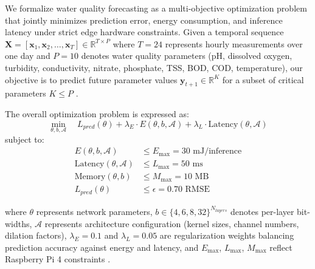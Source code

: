 \documentclass[12pt,a4paper]{article}
\begin{document}
We formalize water quality forecasting as a multi-objective optimization problem that jointly minimizes prediction error, energy consumption, and inference latency under strict edge hardware constraints. Given a temporal sequence $\mathbf{X} = [\mathbf{x}_1, \mathbf{x}_2, \ldots, \mathbf{x}_T] \in \mathbb{R}^{T \times P}$ where $T=24$ represents hourly measurements over one day and $P=10$ denotes water quality parameters (pH, dissolved oxygen, turbidity, conductivity, nitrate, phosphate, TSS, BOD, COD, temperature), our objective is to predict future parameter values $\mathbf{y}_{t+1} \in \mathbb{R}^{K}$ for a subset of critical parameters $K \leq P$ \citep{lin2021tcan, essamlali2024iotml}.

The overall optimization problem is expressed as:
\begin{equation}
\label{eq:objective}
\min_{\theta, b, \mathcal{A}} \quad L_{pred}(\theta) + \lambda_E \cdot E(\theta, b, \mathcal{A}) + \lambda_L \cdot \text{Latency}(\theta, \mathcal{A})
\end{equation}
subject to:
\begin{align}
E(\theta, b, \mathcal{A}) &\leq E_{\max} = 30 \text{ mJ/inference} \label{eq:energy_constraint}\\
\text{Latency}(\theta, \mathcal{A}) &\leq L_{\max} = 50 \text{ ms} \label{eq:latency_constraint}\\
\text{Memory}(\theta, b) &\leq M_{\max} = 10 \text{ MB} \label{eq:memory_constraint}\\
L_{pred}(\theta) &\leq \epsilon = 0.70 \text{ RMSE} \label{eq:accuracy_constraint}
\end{align}

where $\theta$ represents network parameters, $b \in \{4,6,8,32\}^{N_{layers}}$ denotes per-layer bit-widths, $\mathcal{A}$ represents architecture configuration (kernel sizes, channel numbers, dilation factors), $\lambda_E=0.1$ and $\lambda_L=0.05$ are regularization weights balancing prediction accuracy against energy and latency, and $E_{\max}$, $L_{\max}$, $M_{\max}$ reflect Raspberry Pi 4 constraints \citep{chitty2022hwnas, sinha2024hwevnas}.
\end{document}
